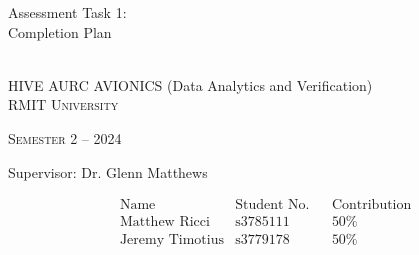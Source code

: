\documentclass[a4paper, oneside]{memoir}
\newcommand*{\semester}[2]{Semester #1 -- #2} %
\newcommand*{\student}[3]{&\text{#1} &\text{#2} &&\text{#3}} %
\newcommand*{\titleAM}[4]%
{\begingroup
  \centering
  {\Huge Assessment Task 1:\\#3\par}\\[\baselineskip]
  {\Large HIVE AURC AVIONICS (Data Analytics and Verification)}\\[\baselineskip]
  {\small\scshape RMIT University}\par
  {\small\scshape #4}\par\vspace{0.5em}
  {\large Supervisor: #1}\par\vspace{0.5em}
  \endgroup}
\begin{document}
  \titleAM{Dr. Glenn Matthews}{2}{Completion Plan}{\semester{2}{2024}}
  \begin{align*}
    &\text{Name} &\text{Student No.} &&\text{Contribution}\\
    \student{Matthew Ricci}{s3785111}{50\%}\\
    \student{Jeremy Timotius}{s3779178}{50\%}
  \end{align*}

  \clearpage
  \noindent{}
  \vspace{2.5em}
  \tableofcontents*
  \vfill
  \noindent{}
  \thispagestyle{empty}
  \clearpage

  \renewcommand{\abstractname}{Summary}

  \markboth{}{}
  

  
\end{document}
